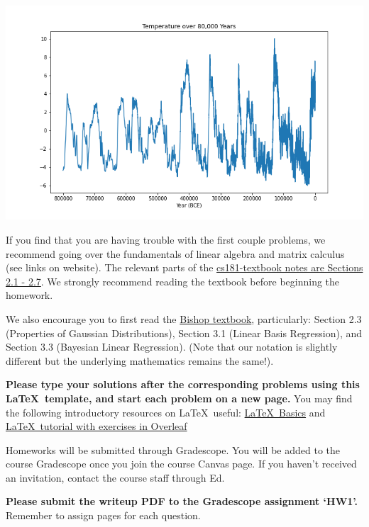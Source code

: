 \documentclass[submit]{harvardml}
\begin{document}
\begin{center}
\includegraphics[width=.8\textwidth]{images/temperature}
\end{center}
\noindent 


If you find that you are having trouble with the first couple
problems, we recommend going over the fundamentals of linear algebra
and matrix calculus (see links on website).  The relevant parts of the
\href{https://github.com/harvard-ml-courses/cs181-textbook/blob/master/Textbook.pdf}{cs181-textbook notes are Sections 2.1 - 2.7}.  We strongly recommend
reading the textbook before beginning the homework.

We also encourage you to first read the \href{http://users.isr.ist.utl.pt/~wurmd/Livros/school/Bishop\%20-\%20Pattern\%20Recognition\%20And\%20Machine\%20Learning\%20-\%20Springer\%20\%202006.pdf}{Bishop textbook}, particularly:
Section 2.3 (Properties of Gaussian Distributions), Section 3.1
(Linear Basis Regression), and Section 3.3 (Bayesian Linear
Regression). (Note that our notation is slightly different but the
underlying mathematics remains the same!).

\textbf{Please type your solutions after the corresponding problems using this
\LaTeX\ template, and start each problem on a new page.} You may find
the following introductory resources on \LaTeX\ useful: 
\href{http://www.mjdenny.com/workshops/LaTeX_Intro.pdf}{\LaTeX\ Basics} 
and \href{https://www.overleaf.com/learn/latex/Free_online_introduction_to_LaTeX_(part_1)}{\LaTeX\ tutorial with exercises in Overleaf}

Homeworks will be submitted through Gradescope. You will be added to
the course Gradescope once you join the course Canvas page. If you
haven't received an invitation, contact the course staff through Ed.

\textbf{Please submit the writeup PDF to the Gradescope assignment
  `HW1'.} Remember to assign pages for each question.
\end{document}
